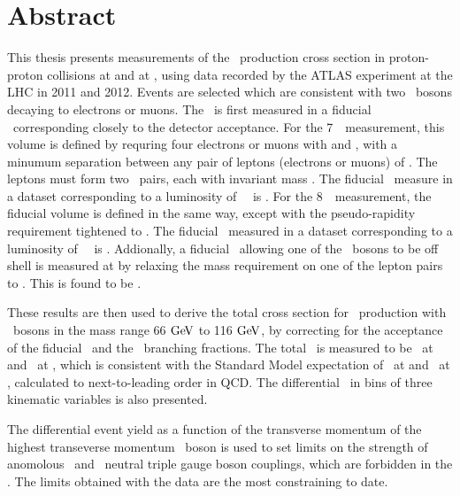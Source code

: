 \chapter*{Abstract}
This thesis presents measurements of the \ZZ\ production cross section in
proton-proton collisions at  and at , using data recorded
by the ATLAS experiment at the LHC in 2011 and 2012.  Events are selected which
are consistent with two \Z\ bosons decaying to electrons or muons. The \cx\ is
first measured in a fiducial \phasespace\ corresponding closely to the detector
acceptance. For the 7~\tev\ measurement, this volume is defined by requring four
electrons or muons with  and , with a minumum separation
between any pair of leptons (electrons or muons) of . The leptons
must form two \ossf\ pairs, each with invariant mass \sstooos. The fiducial \cx\
measure in a dataset corresponding to a luminosity of
\LumiPassGRLTwentyEleven~\ifb\ is \ZZSevenTeVFiducialCrossSectionZZLLLL. For the
8~\tev\ measurement, the fiducial volume is defined in the same way, except with
the pseudo-rapidity requirement tightened to \modetalt{2.7}. The fiducial \cx\
measured in a dataset corresponding to a luminosity of
\LumiPassGRLTwentyTwelve~\ifb\ is \ZZEightTeVFiducialCrossSectionZZLLLL.
Addionally, a fiducial \cx\ allowing one of the \Z\ bosons to be off shell is
measured at \sqrtseq{7} by relaxing the mass requirement on one of the lepton pairs
to \mllgtt. This is found to be \ZZSevenTeVFiducialCrossSectionZZsLLLL.

These results are then used to derive the total cross section for \ZZ\
production with \Z\ bosons in the mass range 66$\GeV$ to 116$\GeV$, by
correcting for the acceptance of the fiducial \phasespace\ and the \Zll\
branching fractions. The total \cx\ is measured to be
\ZZSevenTeVTotalCrossSection\ at \sqrtseq{7} and \ZZEightTeVTotalCrossSection\ at
\sqrtseq{8}, which is consistent with the Standard Model
expectation of \ZZSevenTeVTheoryTotalCrossSection\ at \sqrtseq{7} and \ZZEightTeVTheoryTotalCrossSection\ at
\sqrtseq{8}, calculated to next-to-leading order in QCD.
The differential \cx\ in bins of three kinematic variables is also
presented.

The differential event yield as a function of the transverse momentum of the
highest transeverse momentum \Z\ boson is used to set limits on the strength of
anomolous \ZZZ\ and \ZZg\ neutral triple gauge boson couplings, which are
forbidden in the \sm. 
The limits obtained with the \sqrtseq{8} data are the most
constraining to date.
